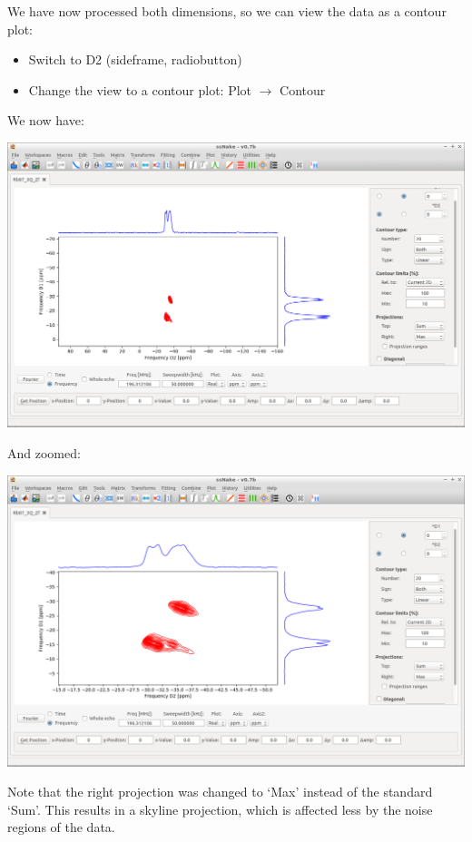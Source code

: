 \documentclass[11pt,a4paper]{article}
\begin{document}
We have now processed both dimensions, so we can view the data as a contour plot:
\begin{itemize}
	\item Switch to D2 (sideframe, radiobutton)
	\item Change the view to a contour plot: Plot  $\longrightarrow$ Contour
\end{itemize}
We now have:
\begin{center}
\includegraphics[width=0.8\linewidth]{Figs/Fig5.png}
\end{center}
And zoomed:
\begin{center}
\includegraphics[width=0.8\linewidth]{Figs/Fig6.png}
\end{center}
Note that the right projection was changed to `Max' instead of the standard `Sum'.
This results in a skyline projection, which is affected less by the noise regions of the data.
\end{document}
